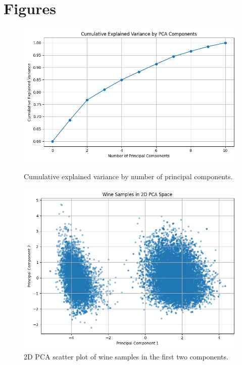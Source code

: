 \documentclass[12pt]{article}
\begin{document}
\section*{Figures}


\begin{figure}[H]
    \centering
    \begin{minipage}[t]{0.48\textwidth}
        \includegraphics[width=\textwidth]{figures/pca_explained_variance.png}
        \caption{Cumulative explained variance by number of principal components.}
        \label{A}
    \end{minipage}
    \hfill
    \begin{minipage}[t]{0.48\textwidth}
        \includegraphics[width=\textwidth]{figures/pca_scatter_plot.png}
        \caption{2D PCA scatter plot of wine samples in the first two components.}
        \label{B}
    \end{minipage}
\end{figure}
\end{document}
